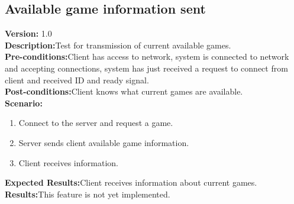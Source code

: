 \documentclass[12pt]{article}
\begin{document}
    \subsection{Available game information sent}
    \textbf{Version:} 1.0\\
    \textbf{Description:}Test for transmission of current available games.\\
    \textbf{Pre-conditions:}Client has access to network, system is connected to network and accepting connections, system has just received a request to connect from client and received ID and ready signal.\\
    \textbf{Post-conditions:}Client knows what current games are available.\\
    \textbf{Scenario:}
    \begin{enumerate}
        \item Connect to the server and request a game.
        \item Server sends client available game information.
        \item Client receives information.
    \end{enumerate}
    \textbf{Expected Results:}Client receives information about current games.\\
    \textbf{Results:}This feature is not yet implemented.\\
\end{document}
